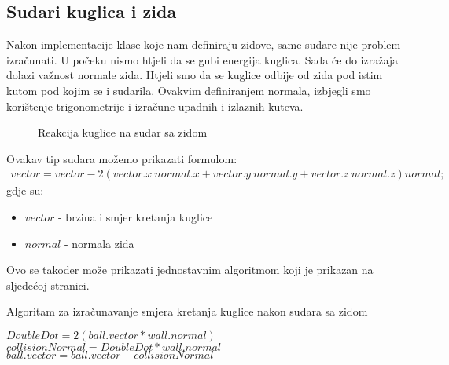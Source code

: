 \subsection{Sudari kuglica i zida}
Nakon implementacije klase koje nam definiraju zidove, same sudare nije problem izračunati. U počeku nismo htjeli da se gubi energija kuglica. Sada će do izražaja dolazi važnost normale zida. Htjeli smo da se kuglice odbije od zida pod istim kutom pod kojim se i sudarila. Ovakvim definiranjem normala, izbjegli smo korištenje trigonometrije i izračune upadnih i izlaznih kuteva.
\begin{figure}[!http]
	\begin{center}
	\end{center}
	\caption {Reakcija kuglice na sudar sa zidom}
	\label{fig:21}
\end{figure}
Ovakav tip sudara možemo prikazati formulom:
\begin{equation}\label{equ:wall_collision}
		\begin{aligned}
			vector = vector - 2(vector.x \ normal.x + vector.y \ normal.y + vector.z \ normal.z) normal;
		\end{aligned}
\end{equation}
gdje su:
\begin{itemize}
	\item $vector$ - brzina i smjer kretanja kuglice
	\item $normal$ - normala zida
\end{itemize}
Ovo se također može prikazati jednostavnim algoritmom koji je prikazan na sljedećoj stranici.
\begin{algorithm}
	\caption{Algoritam za izračunavanje smjera kretanja kuglice nakon sudara sa zidom}
	\label{alg:resolve_Wallcollision}
	\begin{algorithmic}
		\Return
		\EndIf
		\State $DoubleDot = 2  (ball.vector * wall.normal)$
		\State $collisionNormal = DoubleDot * wall.normal$
		\State $ball.vector = ball.vector - collisionNormal$
		\EndFunction
	\end{algorithmic}
\end{algorithm}\newpage

